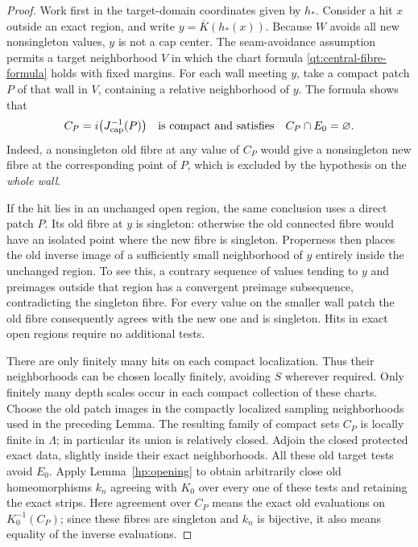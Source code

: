 \begin{proof}
Work first in the target-domain coordinates given by $h_*$.
Consider a hit $x$ outside an exact region, and write
$y=\overline K(h_*(x))$.  Because $W$ avoids all new nonsingleton
values, $y$ is not a cap center.  The seam-avoidance assumption
permits a target neighborhood $V$ in which the chart formula
\eqref{qt:central-fibre-formula} holds with fixed margins.  For each
wall meeting $y$, take a compact patch $P$ of that wall in $V$,
containing a relative neighborhood of $y$.  The formula shows that
\begin{equation}\label{qt:central-old-wall-test}
 C_P=i\bigl(J_{\rm cap}^{-1}(P)\bigr)
             \quad\text{is compact and satisfies}\quad C_P\cap E_0=\varnothing.
\end{equation}
Indeed, a nonsingleton old fibre at any value of $C_P$ would give
a nonsingleton new fibre at the corresponding point of $P$, which
is excluded by the hypothesis on the \emph{whole wall}.

If the hit lies in an unchanged open region, the same conclusion
uses a direct patch $P$.  Its old fibre at $y$ is singleton:
otherwise the old connected fibre would have an isolated point
where the new fibre is singleton.  Properness then places the old
inverse image of a sufficiently small neighborhood of $y$ entirely
inside the unchanged region.  To see this, a contrary sequence of
values tending to $y$ and preimages outside that region has a
convergent preimage subsequence, contradicting the singleton fibre.
For every value on the smaller wall patch the old fibre consequently
agrees with the new one and is singleton.  Hits in exact open
regions require no additional tests.

There are only finitely many hits on each compact localization.
Thus their neighborhoods can be chosen locally finitely, avoiding
$S$ wherever required.  Only finitely many depth scales occur in
each compact collection of these charts.  Choose the old patch
images in the compactly localized sampling neighborhoods used in
the preceding Lemma.  The resulting family of compact sets $C_P$
is locally finite in $\Lambda$; in particular its union is relatively
closed.  Adjoin the closed protected exact data, slightly inside
their exact neighborhoods.  All these old target tests avoid $E_0$.
Apply Lemma~\ref{hp:opening} to obtain arbitrarily close old
homeomorphisms $k_n$ agreeing with $K_0$ over every one of these
tests and retaining the exact strips.  Here agreement over $C_P$
means the exact old evaluations on $K_0^{-1}(C_P)$; since these
fibres are singleton and $k_n$ is bijective, it also means equality
of the inverse evaluations.


\end{proof}
